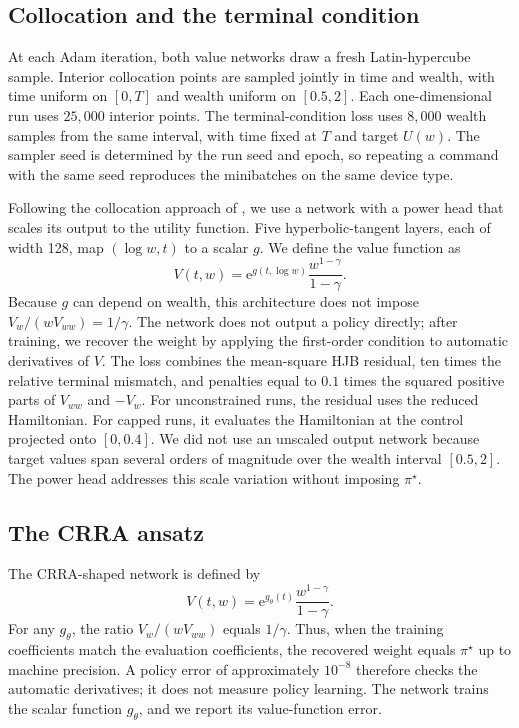 \documentclass[11pt,a4paper]{article}
\begin{document}
\subsection{Collocation and the terminal condition}

At each Adam iteration, both value networks draw a fresh Latin-hypercube sample. Interior collocation points are sampled jointly in time and wealth, with time uniform on $[0,T]$ and wealth uniform on $[0.5,2]$. Each one-dimensional run uses $25{,}000$ interior points. The terminal-condition loss uses $8{,}000$ wealth samples from the same interval, with time fixed at $T$ and target $U(w)$. The sampler seed is determined by the run seed and epoch, so repeating a command with the same seed reproduces the minibatches on the same device type.

Following the collocation approach of \citet{raissi2019}, we use a network with a power head that scales its output to the utility function. Five hyperbolic-tangent layers, each of width 128, map $(\log w,t)$ to a scalar $g$. We define the value function as
\begin{equation}
V(t,w)=\mathrm e^{g(t,\log w)}\frac{w^{1-\gamma}}{1-\gamma}.
\end{equation}
Because $g$ can depend on wealth, this architecture does not impose $V_w/(wV_{ww})=1/\gamma$. The network does not output a policy directly; after training, we recover the weight by applying the first-order condition to automatic derivatives of $V$. The loss combines the mean-square HJB residual, ten times the relative terminal mismatch, and penalties equal to $0.1$ times the squared positive parts of $V_{ww}$ and $-V_w$. For unconstrained runs, the residual uses the reduced Hamiltonian. For capped runs, it evaluates the Hamiltonian at the control projected onto $[0,0.4]$. We did not use an unscaled output network because target values span several orders of magnitude over the wealth interval $[0.5,2]$. The power head addresses this scale variation without imposing $\pi^{\star}$.

\subsection{The CRRA ansatz}

The CRRA-shaped network is defined by
\begin{equation}
V(t,w)=\mathrm e^{g_\theta(t)}\frac{w^{1-\gamma}}{1-\gamma}.
\end{equation}
For any $g_\theta$, the ratio $V_w/(wV_{ww})$ equals $1/\gamma$. Thus, when the training coefficients match the evaluation coefficients, the recovered weight equals $\pi^{\star}$ up to machine precision. A policy error of approximately $10^{-8}$ therefore checks the automatic derivatives; it does not measure policy learning. The network trains the scalar function $g_\theta$, and we report its value-function error.
\end{document}
